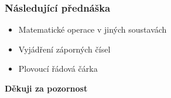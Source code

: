   \begin{frame}
    \frametitle{Následující přednáška}
		
		
		\begin{itemize}
			\item Matematické operace v jiných soustavách
			\item Vyjádření záporných čísel
			\item Plovoucí řádová čárka
		\end{itemize}
		
		\begin{center}
			\textbf{Děkuji za pozornost}
		\end{center}
		
	\end{frame}
